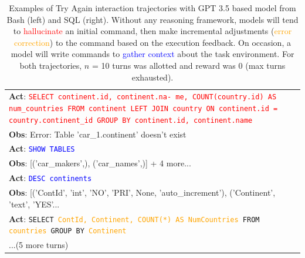 \begin{table}[H]
\begin{minipage}[t]{.49\linewidth}
\begin{tabularx}{\textwidth}{X}
\midrule
\textbf{Act}: \textcolor{red}{\texttt{SELECT continent.id, continent.na- me, COUNT(country.id) AS num\_countries FROM continent LEFT 
JOIN country ON continent.id = country.continent\_id GROUP BY continent.id, continent.name}} \\
\textbf{Obs}: Error: Table 'car\_1.continent' doesn't exist \\
\textbf{Act}: \textcolor{blue}{\texttt{SHOW TABLES}} \\
\textbf{Obs}: [('car\_makers',), ('car\_names',)] + 4 more... \\
\textbf{Act}: \textcolor{blue}{\texttt{DESC continents}} \\
\textbf{Obs}: [('ContId', 'int', 'NO', 'PRI', None, 'auto\_increment'), ('Continent', 'text', 'YES'...
\\
\textbf{Act}: \texttt{SELECT \textcolor{orange}{ContId, Continent, COUNT(*) AS NumCountries} FROM \textcolor{orange}{countries} GROUP BY \textcolor{orange}{Continent}} \\
...(5 more turns) \\
\bottomrule
\end{tabularx}
\end{minipage}
\vspace{1em}
\caption{Examples of Try Again interaction trajectories with GPT 3.5 based model from Bash (left) and SQL (right). Without any reasoning framework, models will tend to \textcolor{red}{hallucinate} an initial command, then make incremental adjustments (\textcolor{orange}{error correction}) to the command based on the execution feedback. On occasion, a model will write commands to \textcolor{blue}{gather context} about the task environment. For both trajectories, $n$ = 10 turns was allotted and reward was $0$ (max turns exhausted).}
\label{table:expr-default-behavior}
\vspace{-1.5em}
\end{table}